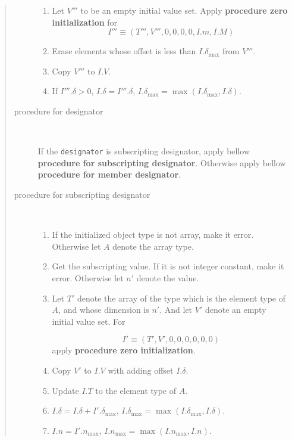 \begin{quotation}
\begin{description}
\begin{enumerate}
\item \label{initializer015}
Let $V'''$ to be an empty initial value set.
Apply {\bf procedure zero initialization} for
\[
 I''' \equiv (T''',V''',0,0,0,0,I.m,I.M)
\]

\item Erase elements whose offset is less than $I.{\delta}_{\max}$
from $V'''$. 

\item Copy $V'''$ to $I.V$.

\item If $I'''.\delta > 0$,
$I.\delta = I'''.\delta$,
$I.\delta_{\max} = \max(I.\delta_{\max},I.\delta)$.

\end{enumerate}

\item[procedure for designator]

\

If the {\tt{designator}} is subscripting designator,
apply bellow {\bf procedure for subscripting designator}.
Otherwise apply bellow {\bf procedure for member designator}.

\item[procedure for subscripting designator]

\

\begin{enumerate}
\item If the initialized object type is not array, make it error.
      Otherwise let $A$ denote the array type.
\item Get the subscripting value. If it is not integer constant,
      make it error. Otherwise let $n'$ denote the value.
\item Let $T'$ denote the array of the type which is the element type of
      $A$, and whose dimension is $n'$. And let $V'$ denote an empty
      initial value set. For

\[
 I' \equiv (T',V',0,0,0,0,0,0) 
\]
apply {\bf procedure zero initialization}.

\item Copy $V'$ to $I.V$ with adding offset $I.\delta$.

\item Update $I.T$ to the element type of $A$.
\item $I.\delta = I.\delta + I'.{\delta_{\max}}$,  
      $I.{\delta_{\max}} = {\max}(I.{\delta_{\max}},I.\delta)$.
\item $I.n = I'.n_{\max}$,
      $I.n_{\max} = {\max}(I.n_{\max},I.n)$.
\end{enumerate}


\end{description}
\end{quotation}
